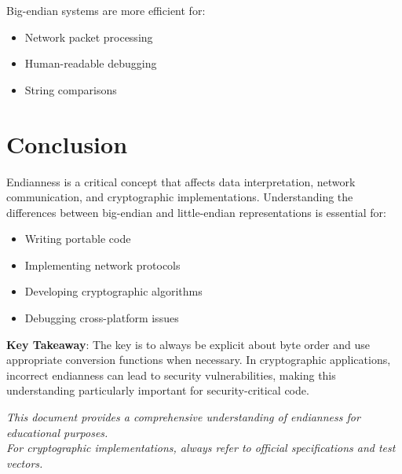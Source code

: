 \documentclass[11pt,a4paper]{article}
\begin{document}
Big-endian systems are more efficient for:
\begin{itemize}
    \item Network packet processing
    \item Human-readable debugging
    \item String comparisons
\end{itemize}

\section{Conclusion}

Endianness is a critical concept that affects data interpretation, network communication, and cryptographic implementations. Understanding the differences between big-endian and little-endian representations is essential for:

\begin{itemize}
    \item Writing portable code
    \item Implementing network protocols
    \item Developing cryptographic algorithms
    \item Debugging cross-platform issues
\end{itemize}

\begin{definitionbox}
\textbf{Key Takeaway}: The key is to always be explicit about byte order and use appropriate conversion functions when necessary. In cryptographic applications, incorrect endianness can lead to security vulnerabilities, making this understanding particularly important for security-critical code.
\end{definitionbox}

\vspace{2cm}

\begin{center}
\textit{This document provides a comprehensive understanding of endianness for educational purposes.\\
For cryptographic implementations, always refer to official specifications and test vectors.}
\end{center}
\end{document}
